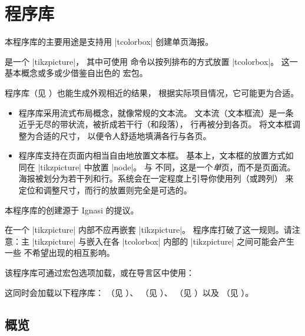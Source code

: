\clearpage
\section{程序库 }\label{sec:poster}%
%

本程序库的主要用途是支持用 |tcolorbox| 创建单页海报。

 是一个 |tikzpicture|，
其中可使用  命令以按列排布的方式放置 |tcolorbox|。
这一基本概念或多或少借鉴自出色的  宏包。

 程序库（见 ）也能生成外观相近的结果，
根据实际项目情况，它可能更为合适。
\begin{itemize}
\item {} 程序库采用流式布局概念，就像常规的文本流。
  文本流（文本框流）是一条近乎无尽的带状流，被折成若干行（和段落），
  行再被分到各页。 将文本框调整为合适的尺寸，
  以便令人舒适地填满各行与各页。
\item {} 程序库支持在页面内相当自由地放置文本框。
  基本上，文本框的放置方式如同在 |tikzpicture| 中放置 |node|。
  与  不同，这是一个\emph{单}页，而不是页面流。
  海报被划分为若干列和行。系统会在一定程度上引导你使用列（或跨列）
  来定位和调整尺寸，而行的放置则完全是可选的。
\end{itemize}
本程序库的创建源于 Ignasi 的提议。

\begin{marker}
在一个 |tikzpicture| 内部不应再嵌套 |tikzpicture|。
 程序库打破了这一规则。请注意：主 |tikzpicture|
与嵌入在各 |tcolorbox| 内部的 |tikzpicture| 之间可能会产生一些
不希望出现的相互影响。
\end{marker}

该程序库可通过宏包选项加载，或在导言区中使用：
\begin{dispListing}
\end{dispListing}
这同时会加载以下程序库：
（见 ）、
（见 ）、
（见 ）以及
（见 ）。


\subsection{概览}\label{subsec:poster_overview}


